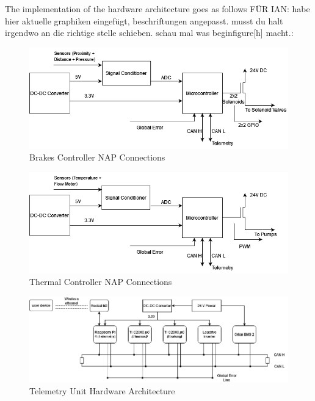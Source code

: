 \begin{enumerate}
The implementation of the hardware architecture goes as follows FÜR IAN: habe hier aktuelle graphiken eingefügt, beschriftungen angepasst. musst du halt irgendwo an die richtige stelle schieben. schau mal was begin{figure}[h] macht.:
    \begin{figure}
        \centering
        \includegraphics[width=\linewidth]{texfiles/elec/eimg/Brakesystems}
        \caption{Brakes Controller NAP Connections} 
        \label{fig:Brakes Controller NAP Connections}
    \end{figure}
 \begin{figure}
        \centering
        \includegraphics[width=\linewidth]{texfiles/elec/eimg/thermalsystems}
        \caption{Thermal Controller NAP Connections}
        \label{fig:Thermal Controller NAP Connections}
    \end{figure}
 \begin{figure}
        \centering
        \includegraphics[width=\textwidth]{texfiles/elec/eimg/telemetrysystems}
        \caption{Telemetry Unit Hardware Architecture}
        \label{fig:Telemetry Unit Hardware Architecture}
    \end{figure}


\end{enumerate}
